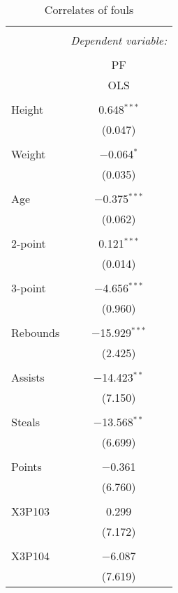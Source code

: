
\begin{table}[!htbp] \centering 
  \caption{Correlates of fouls} 
  \label{foulreg} 
\begin{tabular}{@{\extracolsep{5pt}}lc} 
\\[-1.8ex]\hline 
\hline \\[-1.8ex] 
 & \multicolumn{1}{c}{\textit{Dependent variable:}} \\ 
\cline{2-2} 
\\[-1.8ex] & PF \\ 
 & OLS \\ 
\hline \\[-1.8ex] 
 Height & 0.648$^{***}$ \\ 
  & (0.047) \\ 
  & \\ 
 Weight & $-$0.064$^{*}$ \\ 
  & (0.035) \\ 
  & \\ 
 Age & $-$0.375$^{***}$ \\ 
  & (0.062) \\ 
  & \\ 
 2-point & 0.121$^{***}$ \\ 
  & (0.014) \\ 
  & \\ 
 3-point & $-$4.656$^{***}$ \\ 
  & (0.960) \\ 
  & \\ 
 Rebounds & $-$15.929$^{***}$ \\ 
  & (2.425) \\ 
  & \\ 
 Assists & $-$14.423$^{**}$ \\ 
  & (7.150) \\ 
  & \\ 
 Steals & $-$13.568$^{**}$ \\ 
  & (6.699) \\ 
  & \\ 
 Points & $-$0.361 \\ 
  & (6.760) \\ 
  & \\ 
 X3P103 & 0.299 \\ 
  & (7.172) \\ 
  & \\ 
 X3P104 & $-$6.087 \\ 
  & (7.619) \\ 

\end{tabular}
\end{table}

